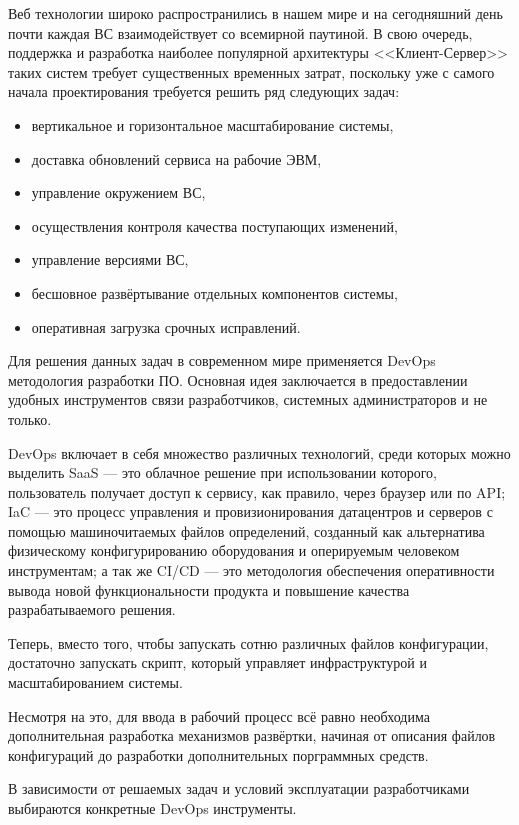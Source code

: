\Introduction

Веб технологии широко распространились в нашем мире и на сегодняшний день почти каждая ВС взаимодействует со всемирной паутиной.
В свою очередь, поддержка и разработка наиболее популярной архитектуры <<Клиент-Сервер>> таких систем требует существенных временных затрат, поскольку уже с самого начала проектирования требуется решить ряд следующих задач:

\begin{itemize}
    \item вертикальное и горизонтальное масштабирование системы,
    \item доставка обновлений сервиса на рабочие ЭВМ,
    \item управление окружением ВС,
    \item осуществления контроля качества поступающих изменений,
    \item управление версиями ВС,
    \item бесшовное развёртывание отдельных компонентов системы,
    \item оперативная загрузка срочных исправлений.
\end{itemize}

Для решения данных задач в современном мире применяется DevOps методология разработки ПО.
Основная идея заключается в предоставлении удобных инструментов связи разработчиков, системных администраторов и не только.

DevOps включает в себя множество различных технологий, среди которых можно выделить
SaaS --- это облачное решение при использовании
которого, пользователь получает доступ к сервису, как правило, через браузер или по API;
IaC --- это процесс управления и провизионирования датацентров и серверов с помощью машиночитаемых файлов определений,
созданный как альтернатива физическому конфигурированию оборудования и оперируемым человеком инструментам;
а так же CI/CD --- это методология обеспечения оперативности вывода новой функциональности продукта и повышение качества разрабатываемого решения.

Теперь, вместо того, чтобы запускать сотню различных файлов конфигурации,
достаточно запускать скрипт, который управляет инфраструктурой и масштабированием системы.

Несмотря на это, для ввода в рабочий процесс всё равно необходима дополнительная разработка механизмов развёртки,
начиная от описания файлов конфигураций до разработки дополнительных порграммных средств.

В зависимости от решаемых задач и условий эксплуатации разработчиками выбираются конкретные DevOps инструменты.

